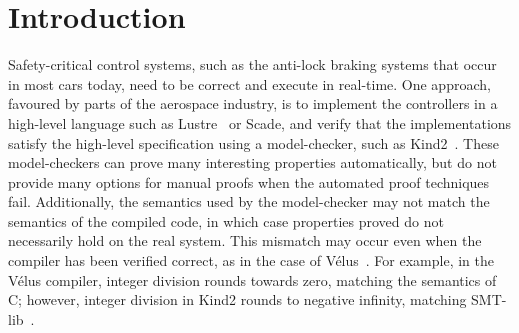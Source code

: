 \documentclass[sigplan,screen]{acmart}
\begin{document}



\maketitle

\makeatactive

\section{Introduction}

Safety-critical control systems, such as the anti-lock braking systems that occur in most cars today, need to be correct and execute in real-time.
One approach, favoured by parts of the aerospace industry, is to implement the controllers in a high-level language such as Lustre~\cite{caspi1995functional} or Scade, and verify that the implementations satisfy the high-level specification using a model-checker, such as Kind2~\cite{champion2016kind2}.
These model-checkers can prove many interesting properties automatically, but do not provide many options for manual proofs when the automated proof techniques fail.
Additionally, the semantics used by the model-checker may not match the semantics of the compiled code, in which case properties proved do not necessarily hold on the real system.
This mismatch may occur even when the compiler has been verified correct, as in the case of Vélus~\cite{bourke2017formally}.
For example, in the Vélus compiler, integer division rounds towards zero, matching the semantics of C; however, integer division in Kind2 rounds to negative infinity, matching SMT-lib~\cite{BarFT2016SMTLIB}.
\end{document}
